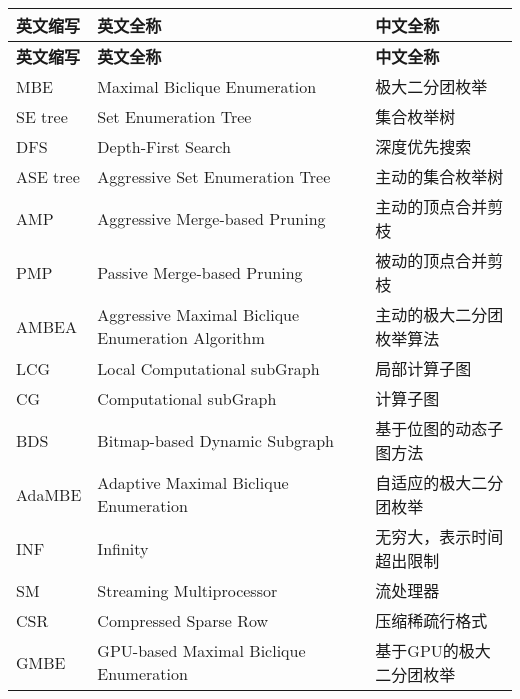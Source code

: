 \cleardoublepage
{}
\begin{center}
    \begin{longtable}{m{2cm}m{8cm}m{5cm}}
        \toprule
        \textbf{英文缩写}&\textbf{英文全称}&\textbf{中文全称}\\
        \midrule
        \endfirsthead
        \toprule
        \textbf{英文缩写}&\textbf{英文全称}&\textbf{中文全称}\\
        \midrule
        \endhead 
        \bottomrule
        \endfoot
        \bottomrule
        \endlastfoot
        MBE&Maximal Biclique Enumeration&极大二分团枚举\\
        SE tree&Set Enumeration Tree&集合枚举树\\
        DFS&Depth-First Search&深度优先搜索\\
        ASE tree&Aggressive Set Enumeration Tree&主动的集合枚举树\\
        AMP&Aggressive Merge-based Pruning&主动的顶点合并剪枝\\
        PMP&Passive Merge-based Pruning&被动的顶点合并剪枝\\
        AMBEA&Aggressive Maximal Biclique Enumeration Algorithm&主动的极大二分团枚举算法\\
        LCG&Local Computational subGraph&局部计算子图\\
        CG&Computational subGraph&计算子图\\
        BDS&Bitmap-based Dynamic Subgraph&基于位图的动态子图方法\\
        AdaMBE&Adaptive Maximal Biclique Enumeration & 自适应的极大二分团枚举\\
        INF&Infinity&无穷大，表示时间超出限制\\        
        SM&Streaming Multiprocessor & 流处理器\\
        CSR&Compressed Sparse Row& 压缩稀疏行格式\\
        GMBE&GPU-based Maximal Biclique Enumeration & 基于GPU的极大二分团枚举\\
        

	\end{longtable}
\end{center}